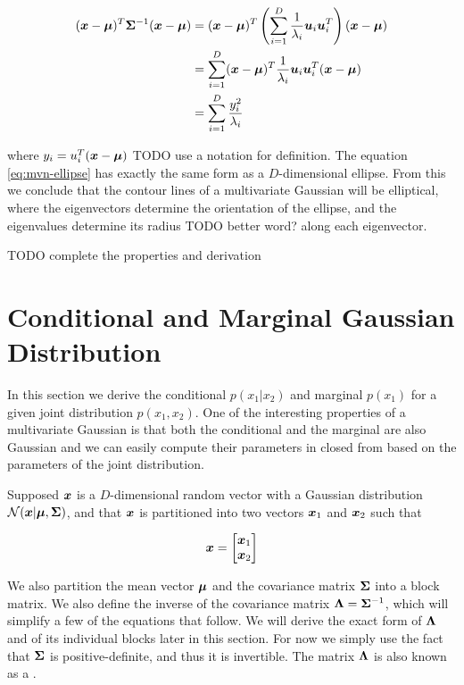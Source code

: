 \begin{tcolorbox}
    \begin{align}
    ({\bm{x}} - {\bm{\mu}})^T {\bm{\Sigma}}^{-1} ({\bm{x}} - {\bm{\mu}}) &= ({\bm{x}} - {\bm{\mu}})^T \left( \sum_{i = 1}^D \frac{1}{\lambda_i} {\bm{u}}_i {\bm{u}}_i^T \right) ({\bm{x}} - {\bm{\mu}}) \\
    &= \sum_{i = 1}^D ({\bm{x}} - {\bm{\mu}})^T \frac{1}{\lambda_i} {\bm{u}}_i {\bm{u}}_i^T ({\bm{x}} - {\bm{\mu}}) \\
    &= \sum_{i = 1}^D \frac{y_i^2}{\lambda_i} \label{eq:mvn-ellipse}
    \end{align}
    
    where $y_i = u_{i}^{T} ({\bm{x}} - {\bm{\mu}})$ {TODO use a notation for definition}. The equation \eqref{eq:mvn-ellipse} has exactly the same form as a $D$-dimensional ellipse. From this we conclude that the contour lines of a multivariate Gaussian will be elliptical, where the eigenvectors determine the orientation of the ellipse, and the eigenvalues determine its radius {TODO better word?} along each eigenvector.
    
    {TODO complete the properties and derivation}
\end{tcolorbox}





\section{Conditional and Marginal Gaussian Distribution}

In this section we derive the conditional $p(x_1 | x_2)$ and marginal $p(x_1)$ for a given joint distribution $p(x_1, x_2)$. One of the interesting properties of a multivariate Gaussian is that both the conditional and the marginal are also Gaussian and we can easily compute their parameters in closed from based on the parameters of the joint distribution.

Supposed ${\bm{x}}$ is a $D$-dimensional random vector with a Gaussian distribution ${\mathcal{N}}({\bm{x}} | {\bm{\mu}}, {\bm{\Sigma}})$, and that ${\bm{x}}$ is partitioned into two vectors ${\bm{x}}_1$ and ${\bm{x}}_2$ such that

\begin{equation}
    {\bm{x}} = {\begin{bmatrix} {\bm{x}}_1 \\ {\bm{x}}_2 \end{bmatrix}}
\end{equation}

We also partition the mean vector ${\bm{\mu}}$ and the covariance matrix ${\bm{\Sigma}}$ into a block matrix. We also define the inverse of the covariance matrix ${\bm{\Lambda}} = {\bm{\Sigma}}^{-1}$, which will simplify a few of the equations that follow. We will derive the exact form of ${\bm{\Lambda}}$ and of its individual blocks later in this section. For now we simply use the fact that ${\bm{\Sigma}}$ is positive-definite, and thus it is invertible. The matrix ${\bm{\Lambda}}$ is also known as a .

